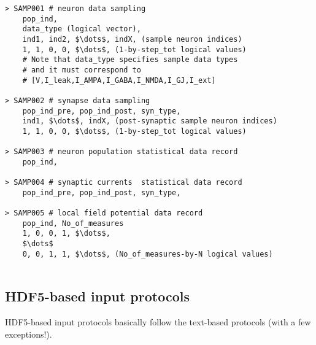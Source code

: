 \documentclass{article}
\begin{document}
\begin{lstlisting}[mathescape]
> SAMP001 # neuron data sampling 
	pop_ind,
	data_type (logical vector),
	ind1, ind2, $\dots$, indX, (sample neuron indices)
	1, 1, 0, 0, $\dots$, (1-by-step_tot logical values)
	# Note that data_type specifies sample data types
	# and it must correspond to 
	# [V,I_leak,I_AMPA,I_GABA,I_NMDA,I_GJ,I_ext]

> SAMP002 # synapse data sampling 
	pop_ind_pre, pop_ind_post, syn_type,
	ind1, $\dots$, indX, (post-synaptic sample neuron indices)
	1, 1, 0, 0, $\dots$, (1-by-step_tot logical values)
	
> SAMP003 # neuron population statistical data record
	pop_ind,
	
> SAMP004 # synaptic currents  statistical data record
	pop_ind_pre, pop_ind_post, syn_type,

> SAMP005 # local field potential data record
	pop_ind, No_of_measures
	1, 0, 0, 1, $\dots$, 
	$\dots$
	0, 0, 1, 1, $\dots$, (No_of_measures-by-N logical values)
	
\end{lstlisting}

\subsection{HDF5-based input protocols}
HDF5-based input protocols basically follow the text-based protocols (with a few exceptions!).

\hfill\begin{minipage}{\dimexpr\textwidth-1cm}
\xdef\tpd{\the\prevdepth}
\end{minipage}
\end{document}
